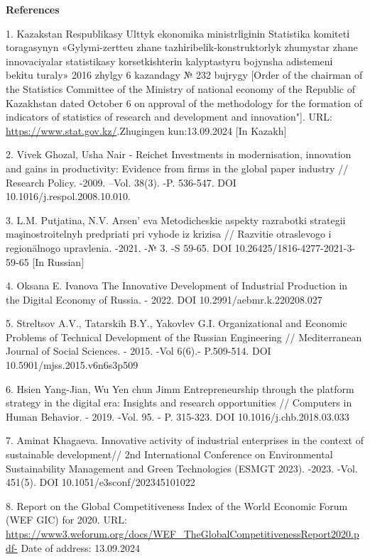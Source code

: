 {{{\bfseries References}

1. Kazakstan Respublikasy Ulttyk ekonomika ministrlіgіnіn Statistika
komitetі toragasynyn «Gylymi-zertteu zhane tazhіribelіk-konstruktorlyk
zhumystar zhane innovaciyalar statistikasy korsetkіshterіn kalyptastyru
bojynsha adіstemenі bekіtu turaly» 2016 zhylgy 6 kazandagy № 232 bujrygy
{[}Order of the chairman of the Statistics Committee of the Ministry of
national economy of the Republic of Kazakhstan dated October 6 on
approval of the methodology for the formation of indicators of
statistics of research and development and innovation"{]}. URL:
\url{https://www.stat.gov.kz/}.Zhugingen kun:13.09.2024 {[}In Kazakh{]}

2. Vivek Ghozal, Usha Nair - Reichet Investments in modernisation,
innovation and gains in productivity: Evidence from firms in the global
paper industry // Research Policy. -2009. --Vol. 38(3). -P. 536-547. DOI
10.1016/j.respol.2008.10.010.

3. L.M. Putjatina, N.V. Arsen' eva Metodicheskie aspekty
razrabotki strategii maşinostroitelnyh predpriati pri vyhode iz krizisa
// Razvitie otraslevogo i regionälnogo upravlenia. -2021. -№ 3. -S
59-65. DOI 10.26425/1816-4277-2021-3-59-65 {[}In Russian{]}

4. Oksana E. Ivanova The Innovative Development of Industrial Production
in the Digital Economy of Russia. - 2022. DOI 10.2991/aebmr.k.220208.027

5. Streltsov A.V., Tatarskih B.Y., Yakovlev G.I. Organizational and
Economic Problems of Technical Development of the Russian Engineering //
Mediterranean Journal of Social Sciences. - 2015. -Vol 6(6).- P.509-514.
DOI 10.5901/mjss.2015.v6n6s3p509

6. Hsien Yang-Jian, Wu Yen chun Jimm Entrepreneurship through the
platform strategy in the digital era: Insights and research
opportunities // Computers in Human Behavior. - 2019. -Vol. 95. - P.
315-323. DOI 10.1016/j.chb.2018.03.033

7. Aminat Khagaeva. Innovative activity of industrial enterprises in the
context of sustainable development// 2nd International Conference on
Environmental Sustainability Management and Green Technologies (ESMGT
2023). -2023. -Vol. 451(5). DOI 10.1051/e3sconf/202345101022

8. Report on the Global Competitiveness Index of the World Economic
Forum (WEF GIC) for 2020. URL:
\url{https://www3.weforum.org/docs/WEF_TheGlobalCompetitivenessReport2020.pdf-}
Date of address: 13.09.2024

}}

